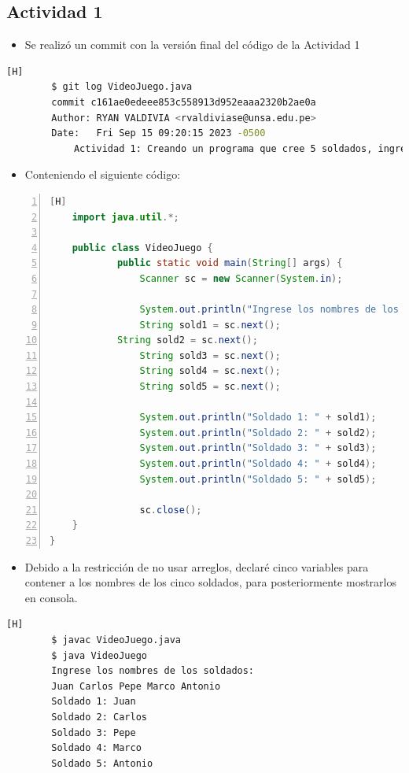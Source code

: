 \documentclass{article}
\begin{document}
	\subsection{Actividad 1}
	\begin{itemize}	
		\item Se realizó un commit con la versión final del código de la Actividad 1  
	\end{itemize}	
	\begin{lstlisting}[language=bash,caption={Comentando la versión final de esta actividad}][H]
		$ git log VideoJuego.java
		commit c161ae0edeee853c558913d952eaaa2320b2ae0a
		Author: RYAN VALDIVIA <rvaldiviase@unsa.edu.pe>
		Date:   Fri Sep 15 09:20:15 2023 -0500
			Actividad 1: Creando un programa que cree 5 soldados, ingrese sus nombres y luego los muestre
	\end{lstlisting}
	\begin{itemize}	
		\item Conteniendo el siguiente código:  
	\end{itemize}
	\begin{lstlisting}[language=java,caption={Los 5 soldados}, numbers=left][H]
	import java.util.*;

	public class VideoJuego {
    		public static void main(String[] args) {
    			Scanner sc = new Scanner(System.in);

        		System.out.println("Ingrese los nombres de los soldados: ");
        		String sold1 = sc.next();
       		String sold2 = sc.next();
        		String sold3 = sc.next();
        		String sold4 = sc.next();
        		String sold5 = sc.next();

        		System.out.println("Soldado 1: " + sold1);
        		System.out.println("Soldado 2: " + sold2);
        		System.out.println("Soldado 3: " + sold3);
        		System.out.println("Soldado 4: " + sold4);
        		System.out.println("Soldado 5: " + sold5);

        		sc.close();
    }
}
	\end{lstlisting}
	\begin{itemize}	
		\item Debido a la restricción de no usar arreglos, declaré cinco variables para contener a los nombres de los cinco soldados, para posteriormente mostrarlos en consola.
	\end{itemize}
	\begin{lstlisting}[language=bash,caption={Compilación y ejecución del programa}][H]
		$ javac VideoJuego.java
		$ java VideoJuego
		Ingrese los nombres de los soldados:
		Juan Carlos Pepe Marco Antonio
		Soldado 1: Juan
		Soldado 2: Carlos
		Soldado 3: Pepe
		Soldado 4: Marco
		Soldado 5: Antonio
	\end{lstlisting}
	
\end{document}
